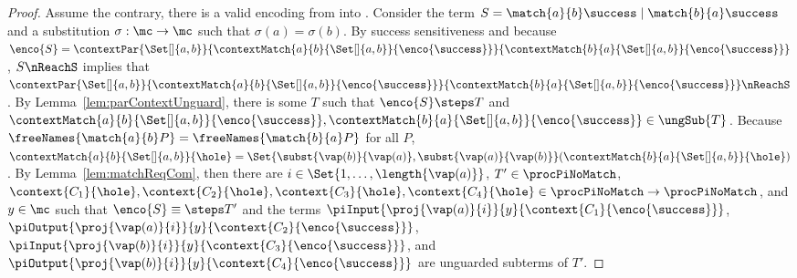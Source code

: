 \documentclass[]{article}
\begin{document}
\begin{proof}
	Assume the contrary, \ie there is a valid encoding \encod from \piT into \piNM.
	Consider the term $ S = \match{a}{b}\success \mid \match{b}{a}\success $ and a substitution $ \sigma : \mc \to \mc $ such that $ \sigma(a) = \sigma(b) $.
	By success sensitiveness and because $ \enco{S} = \contextPar{\Set[]{ a, b }}{\contextMatch{a}{b}{\Set[]{ a, b }}{\enco{\success}}}{\contextMatch{b}{a}{\Set[]{ a, b }}{\enco{\success}}} $, $ S \nReachS $ implies that $ \contextPar{\Set[]{ a, b }}{\contextMatch{a}{b}{\Set[]{ a, b }}{\enco{\success}}}{\contextMatch{b}{a}{\Set[]{ a, b }}{\enco{\success}}} \nReachS $.
	By Lemma~\ref{lem:parContextUnguard}, there is some $ T $ such that $ \enco{S} \steps T $ and $ \contextMatch{a}{b}{\Set[]{ a, b }}{\enco{\success}}, \contextMatch{b}{a}{\Set[]{ a, b }}{\enco{\success}} \in \ungSub{T} $.
	Because $ \freeNames{\match{a}{b}P} = \freeNames{\match{b}{a}P} $ for all $ P $, $ \contextMatch{a}{b}{\Set[]{ a, b }}{\hole} = \Set{ \subst{\vap(b)}{\vap(a)}, \subst{\vap(a)}{\vap(b)} }\!\left( \contextMatch{b}{a}{\Set[]{ a, b }}{\hole} \right) $.
	By Lemma~\ref{lem:matchReqCom}, then there are $ i \in \Set{ 1, \ldots, \length{\vap(a)}} $, $ T' \in \procPiNoMatch $, $ \context{C_1}{\hole}, \context{C_2}{\hole}, \context{C_3}{\hole}, \context{C_4}{\hole} \in \procPiNoMatch \to \procPiNoMatch $, and $ y \in \mc $ such that $ \enco{S} \equiv\steps T' $ and the terms $ \piInput{\proj{\vap\!\left( a \right)}{i}}{y}{\context{C_1}{\enco{\success}}} $, $ \piOutput{\proj{\vap\!\left( a \right)}{i}}{y}{\context{C_2}{\enco{\success}}} $, $ \piInput{\proj{\vap\!\left( b \right)}{i}}{y}{\context{C_3}{\enco{\success}}} $, and $ \piOutput{\proj{\vap\!\left( b \right)}{i}}{y}{\context{C_4}{\enco{\success}}} $ are unguarded subterms of $ T' $.



\end{proof}
\end{document}
